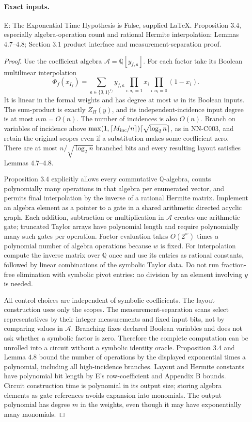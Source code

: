 \paragraph{Exact inputs.}
E: The Exponential Time Hypothesis is False, supplied LaTeX. Proposition 3.4, especially algebra-operation count and rational Hermite interpolation; Lemmas 4.7--4.8; Section 3.1 product interface and measurement-separation proof.

\begin{proof}
Use the coefficient algebra $\mathcal A=\mathbb Q[y_{f,a}]$. For each factor take its Boolean multilinear interpolation
\[
 \Phi_f(x_{I_f})=\sum_{a\in\{0,1\}^{I_f}}y_{f,a}
       \prod_{i:a_i=1}x_i\prod_{i:a_i=0}(1-x_i).
\]
It is linear in the formal weights and has degree at most $w$ in its Boolean inputs. The sum-product is exactly $Z_H(y)$, and its independent-incidence input degree is at most $wm=O(n)$. The number of incidences is also $O(n)$. Branch on variables of incidence above $\max(1,\lceil M_{\rm inc}/n\rceil)\lceil\sqrt{\log_2n}\rceil$, as in NN-C003, and retain the original scopes even if a substitution makes some coefficient zero. There are at most $n/\sqrt{\log_2n}$ branched bits and every resulting layout satisfies Lemmas 4.7--4.8.

Proposition 3.4 explicitly allows every commutative $\mathbb Q$-algebra, counts polynomially many operations in that algebra per enumerated vector, and permits final interpolation by the inverse of a rational Hermite matrix. Implement an algebra element as a pointer to a gate in a shared arithmetic directed acyclic graph. Each addition, subtraction or multiplication in $\mathcal A$ creates one arithmetic gate; truncated Taylor arrays have polynomial length and require polynomially many such gates per operation. Factor evaluation takes $O(2^w)$ times a polynomial number of algebra operations because $w$ is fixed. For interpolation compute the inverse matrix over $\mathbb Q$ once and use its entries as rational constants, followed by linear combinations of the symbolic Taylor data. Do not run fraction-free elimination with symbolic pivot entries: no division by an element involving $y$ is needed.

All control choices are independent of symbolic coefficients. The layout construction uses only the scopes. The measurement-separation scans select representatives by their integer measurements and fixed input bits, not by comparing values in $\mathcal A$. Branching fixes declared Boolean variables and does not ask whether a symbolic factor is zero. Therefore the complete computation can be unrolled into a circuit without a symbolic identity oracle. Proposition 3.4 and Lemma 4.8 bound the number of operations by the displayed exponential times a polynomial, including all high-incidence branches. Layout and Hermite constants have polynomial bit length by E's row-coefficient and Appendix B bounds. Circuit construction time is polynomial in its output size; storing algebra elements as gate references avoids expansion into monomials. The output polynomial has degree $m$ in the weights, even though it may have exponentially many monomials.


\end{proof}
